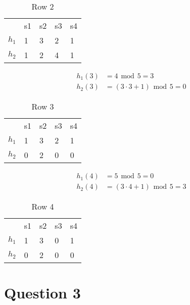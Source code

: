 \documentclass[11pt,twoside,a4paper]{article}
\begin{document}
	\begin{table}[h!]
	\centering
	\label{my-label}
	\begin{tabular}{lllll}
	 & s1 & s2 & s3 & s4 \\
	 $h_1$ & 1 & 3 & 2 & 1 \\
	 $h_2$ & 1 & 2 & 4 & 1
	\end{tabular}
	\caption{Row 2}
	\end{table}
	
	\begin{align}
		h_1(3) &= 4 \hspace{5pt} \mbox{mod} \hspace{5pt} 5 = 3 \\
		h_2(3) &= (3 \cdot 3 + 1) \hspace{5pt} \mbox{mod} \hspace{5pt} 5 = 0
	\end{align}
	
	\begin{table}[h!]
	\centering
	\label{my-label}
	\begin{tabular}{lllll}
	 & s1 & s2 & s3 & s4 \\
	 $h_1$ & 1 & 3 & 2 & 1 \\
	 $h_2$ & 0 & 2 & 0 & 0
	\end{tabular}
	\caption{Row 3}
	\end{table}
	
	\begin{align}
		h_1(4) &= 5 \hspace{5pt} \mbox{mod} \hspace{5pt} 5 = 0 \\
		h_2(4) &= (3 \cdot 4 + 1) \hspace{5pt} \mbox{mod} \hspace{5pt} 5 = 3
	\end{align}
	
	\begin{table}[h!]
	\centering
	\label{my-label}
	\begin{tabular}{lllll}
	 & s1 & s2 & s3 & s4 \\
	 $h_1$ & 1 & 3 & 0 & 1 \\
	 $h_2$ & 0 & 2 & 0 & 0
	\end{tabular}
	\caption{Row 4}
	\end{table}
 	
 \section{Question 3}
 
\end{document}
